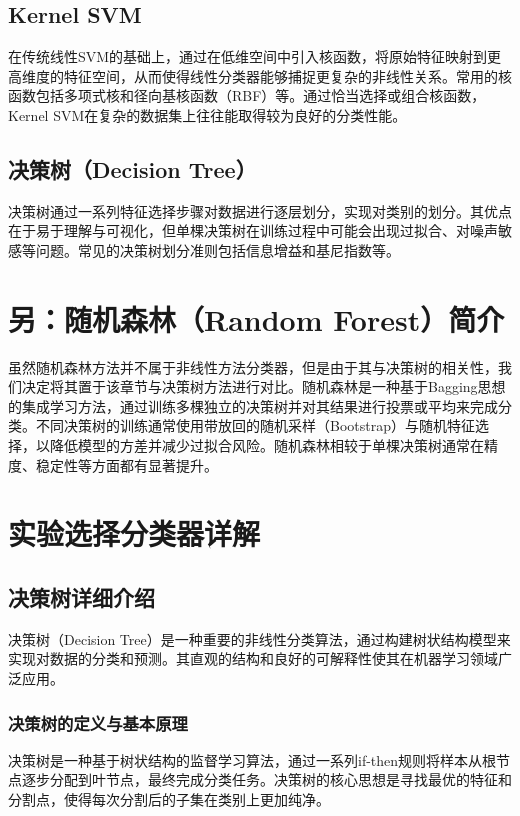 \documentclass[UTF8]{report}
\theoremstyle{MyLineTheoremStyle} %
\theoremstyle{MyBlockTheoremStyle} %
\theoremstyle{MySubsubsectionStyle} %
\begin{document}
\subsection{Kernel SVM}
在传统线性SVM的基础上，通过在低维空间中引入核函数，将原始特征映射到更高维度的特征空间，从而使得线性分类器能够捕捉更复杂的非线性关系。常用的核函数包括多项式核和径向基核函数（RBF）等。通过恰当选择或组合核函数，Kernel SVM在复杂的数据集上往往能取得较为良好的分类性能。

\subsection{决策树（Decision Tree）}
决策树通过一系列特征选择步骤对数据进行逐层划分，实现对类别的划分。其优点在于易于理解与可视化，但单棵决策树在训练过程中可能会出现过拟合、对噪声敏感等问题。常见的决策树划分准则包括信息增益和基尼指数等。
\section{另：随机森林（Random Forest）简介}
虽然随机森林方法并不属于非线性方法分类器，但是由于其与决策树的相关性，我们决定将其置于该章节与决策树方法进行对比。随机森林是一种基于Bagging思想的集成学习方法，通过训练多棵独立的决策树并对其结果进行投票或平均来完成分类。不同决策树的训练通常使用带放回的随机采样（Bootstrap）与随机特征选择，以降低模型的方差并减少过拟合风险。随机森林相较于单棵决策树通常在精度、稳定性等方面都有显著提升。

\section{实验选择分类器详解}

\subsection{决策树详细介绍}

决策树（Decision Tree）是一种重要的非线性分类算法，通过构建树状结构模型来实现对数据的分类和预测。其直观的结构和良好的可解释性使其在机器学习领域广泛应用。

\subsubsection{决策树的定义与基本原理}

决策树是一种基于树状结构的监督学习算法，通过一系列if-then规则将样本从根节点逐步分配到叶节点，最终完成分类任务。决策树的核心思想是寻找最优的特征和分割点，使得每次分割后的子集在类别上更加纯净。
\end{document}
